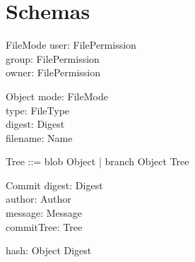 \section{Schemas}

\begin{schema}{FileMode}
  user: FilePermission \\
  group: FilePermission \\
  owner: FilePermission
\end{schema}

\begin{schema}{Object}
  mode: FileMode \\
  type: FileType \\
	digest: Digest \\
	filename: Name
\end{schema}

\begin{zed}
  Tree ::= blob \ldata Object \rdata | branch \ldata Object \cross \finset Tree \rdata
\end{zed}

\begin{schema}{Commit}
	digest: Digest \\
	author: Author \\
	message: Message \\
	commitTree: Tree
\end{schema}

\begin{axdef}
  hash: Object \surj Digest
\end{axdef}

